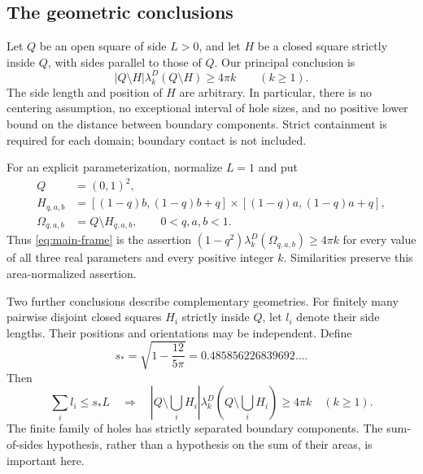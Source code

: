 \documentclass[11pt,reqno]{amsart}
\numberwithin{equation}{section}
\newcommand{\Om}{\Omega}
\begin{document}
\subsection*{The geometric conclusions}

Let $Q$ be an open square of side $L>0$, and let $H$ be a closed
square strictly inside $Q$, with sides parallel to those of $Q$.
Our principal conclusion is
\begin{equation}\label{eq:main-frame}
 \boxed{|Q\setminus H|\lambda_k^D(Q\setminus H)\ge4\pi k
       \qquad(k\ge1).}
\end{equation}
The side length and position of $H$ are arbitrary. In particular,
there is no centering assumption, no exceptional interval of hole
sizes, and no positive lower bound on the distance between boundary
components. Strict containment is required for each domain;
boundary contact is not included.

For an explicit parameterization, normalize $L=1$ and put
\begin{equation}\label{eq:frame}
\begin{split}
 Q&=(0,1)^2,\\
 H_{q,a,b}&=[(1-q)b,(1-q)b+q]\times
              [(1-q)a,(1-q)a+q],\\
 \Om_{q,a,b}&=Q\setminus H_{q,a,b},
 \qquad 0<q,a,b<1.
\end{split}
\end{equation}
Thus \eqref{eq:main-frame} is the assertion
$(1-q^2)\lambda_k^D(\Om_{q,a,b})\ge4\pi k$ for every value
of all three real parameters and every positive integer $k$.
Similarities preserve this area-normalized assertion.

Two further conclusions describe complementary geometries. For
finitely many pairwise disjoint closed squares $H_i$ strictly inside
$Q$, let $l_i$ denote their side lengths. Their positions and
orientations may be independent. Define
\begin{equation}\label{eq:sharp-constant}
 s_* =\sqrt{1-\frac{12}{5\pi}}
       =0.485856226839692\ldots.
\end{equation}
Then
\begin{equation}\label{eq:main-holes}
 \sum_i l_i\le s_*L
 \quad\Longrightarrow\quad
 \left|Q\setminus\bigcup_iH_i\right|
 \lambda_k^D\!\left(Q\setminus\bigcup_iH_i\right)\ge4\pi k
 \quad(k\ge1).
\end{equation}
The finite family of holes has strictly separated boundary
components. The sum-of-sides hypothesis, rather than a hypothesis
on the sum of their areas, is important here.
\end{document}

